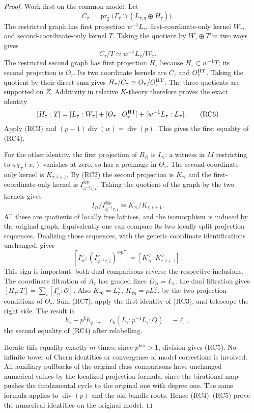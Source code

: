 \begin{proof}
Work first on the common model. Let
\[
 C_\tau=\operatorname{pr}_2\bigl(\Gamma_\tau
                  \cap(L_{\tau,\eta}\oplus H_\tau)\bigr).
\]
The restricted graph has first projection \(w^{-1}L_\tau\),
first-coordinate-only kernel \(W_\tau\), and
second-coordinate-only kernel \(T\). Taking the quotient by
\(W_\tau\oplus T\) in two ways gives
\[
 C_\tau/T\simeq w^{-1}L_\tau/W_\tau.
\]
The restricted second graph has first projection \(H_\tau\)
because \(H_\tau\subset w^{-1}T\); its second projection
is \(O_\tau\). Its two coordinate kernels are
\(C_\tau\) and \(O_\tau^{\rm HT}\). Taking the quotient
by their direct sum gives
\(H_\tau/C_\tau\simeq O_\tau/O_\tau^{\rm HT}\).
The three quotients are supported on \(Z\). Additivity in
relative \(K\)-theory therefore proves the exact identity
\[
 [H_\tau:T]=[L_\tau:W_\tau]+[O_\tau:O_\tau^{\rm HT}]
                         +[w^{-1}L_\tau:L_\tau].            \tag{RC6}
\]
Apply (RC3) and \((p-1)\operatorname{div}(w)=\operatorname{div}(p)\).
This gives the first equality of (RC4).

For the other identity, the first projection of \(B_{\tau i}\)
is \(I_{\tau i}\): a witness in \(M\) restricting to
\(a\chi_\tau(x_i)\) vanishes at zero, so has a preimage in
\(\Theta_\tau\). The second-coordinate-only kernel is
\(K_{\tau,i+1}\). By (RC2) the second projection is
\(K_{\tau i}\) and the first-coordinate-only kernel is
\(I_{\phi^{-1}\tau,i}^{\otimes p}\).
Taking the quotient of the graph by the two kernels gives
\[
 I_{\tau i}/I_{\phi^{-1}\tau,i}^{\otimes p}
                       \simeq K_{\tau i}/K_{\tau,i+1}.
\]
All these are quotients of locally free lattices, and the
isomorphism is induced by the original graph. Equivalently
one can compare its two locally split projection sequences.
Dualizing those sequences, with the generic coordinate
identifications unchanged, gives
\[
 [I_{\tau i}^{\vee}:(I_{\phi^{-1}\tau,i}^{\vee})^{\otimes p}]
                   =[K_{\tau i}^{\vee}:K_{\tau,i+1}^{\vee}].
                                                               \tag{RC7}
\]
This sign is important: both dual comparisons reverse the
respective inclusions. The coordinate filtration of \(A_\tau\)
has graded lines \(D_{\tau i}=I_{\tau i}\); the dual filtration
gives
\([H_\tau:T]=\sum_i[I_{\tau i}^\vee:\mathcal O]\).
Also \(K_{\tau0}=L_\tau^\vee\), \(K_{\tau n}=pL_\tau^\vee\),
by the two projection conditions of \(\Theta_\tau\).
Sum (RC7), apply the first identity of (RC3), and telescope
the right side. The result is
\[
 h_\tau-p^kh_{\phi^{-1}\tau}
   =c_k(L_\tau:p^{-1}L_\tau;Q)=-\ell_\tau,
\]
the second equality of (RC4) after relabelling.

Iterate this equality exactly \(m\) times; since \(p^{km}>1\),
division gives (RC5). No infinite tower of Chern identities
or convergence of model corrections is involved.
All auxiliary pullbacks of the original class comparisons
have unchanged numerical values by the localized projection
formula, since the birational map pushes the fundamental
cycle to the original one with degree one.
The same formula applies to \(\operatorname{div}(p)\)
and the old bundle roots. Hence (RC4)--(RC5) prove the
numerical identities on the original model.
\end{proof}

